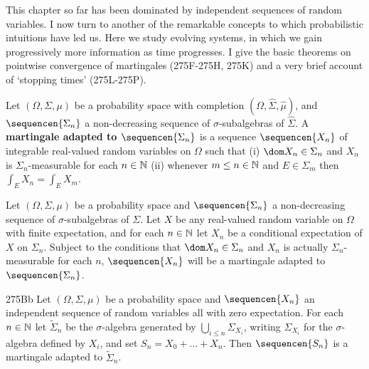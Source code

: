 
\def\chaptername{Probability theory}
\def\sectionname{Martingales}


This chapter so far has been dominated by independent sequences of
random variables.   I now turn to another of the remarkable concepts to
which probabilistic intuitions have led us.   Here we study evolving
systems, in which we gain progressively more information as time
progresses.   I give the basic theorems on pointwise convergence of
martingales (275F-275H, %
275K) and a very brief account of `stopping times'
(275L-275P). %

 Let $(\Omega,\Sigma,\mu)$ be a probability
space with completion $(\Omega,\hat\Sigma,\hat\mu)$, and
$\sequencen{\Sigma_n}$ a non-decreasing sequence of
$\sigma$-subalgebras of $\hat\Sigma$.   
A {\bf martingale adapted to
$\sequencen{\Sigma_n}$} is a sequence $\sequencen{X_n}$ of integrable
real-valued random variables on $\Omega$ such that (i)
$\dom X_n\in\Sigma_n$ and $X_n$ is
$\Sigma_n$-measurable for each $n\in\Bbb N$
(ii) whenever $m\le n\in\Bbb N$
and $E\in\Sigma_m$ then $\int_EX_{n}=\int_EX_m$.


 Let $(\Omega,\Sigma,\mu)$ be a probability space
and $\sequencen{\Sigma_n}$ a non-decreasing sequence of
$\sigma$-subalgebras of $\Sigma$.   Let $X$ be any
real-valued random variable on $\Omega$ with finite expectation, and for
each $n\in\Bbb N$ let
$X_n$ be a conditional expectation of $X$ on $\Sigma_n$.   Subject to the conditions that $\dom X_n\in\Sigma_n$ and $X_n$
is actually $\Sigma_n$-measurable for each $n$, $\sequencen{X_n}$ will be a martingale adapted to
$\sequencen{\Sigma_n}$.

\spheader 275Bb Let $(\Omega,\Sigma,\mu)$ be a probability space
and $\sequencen{X_n}$ an independent sequence of random
variables all with zero expectation.   For each $n\in\Bbb N$ let
$\tilde\Sigma_n$ be the
$\sigma$-algebra generated by $\bigcup_{i\le n}\Sigma_{X_i}$, writing
$\Sigma_{X_i}$ for the
$\sigma$-algebra defined by $X_i$, and set
$S_n=X_0+\ldots+X_n$.   Then $\sequencen{S_n}$ is a martingale adapted
to $\tilde\Sigma_n$.   

